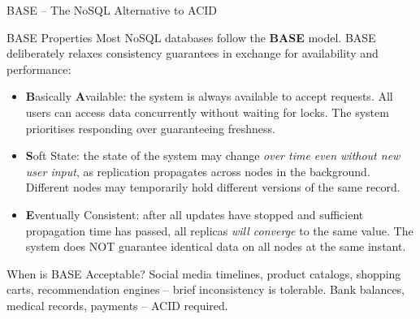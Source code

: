 \begin{frame}{BASE -- The NoSQL Alternative to ACID}
  \begin{block}{BASE Properties}
    Most NoSQL databases follow the \textbf{BASE} model. BASE deliberately relaxes consistency
    guarantees in exchange for availability and performance:
  \end{block}

  \begin{itemize}
    \item \textbf{B}asically \textbf{A}vailable: the system is always available to accept
          requests. All users can access data concurrently without waiting for locks.
          The system prioritises responding over guaranteeing freshness.

    \item \textbf{S}oft State: the state of the system may change \emph{over time even without
          new user input}, as replication propagates across nodes in the background.
          Different nodes may temporarily hold different versions of the same record.

    \item \textbf{E}ventually Consistent: after all updates have stopped and sufficient
          propagation time has passed, all replicas \emph{will converge} to the same value.
          The system does NOT guarantee identical data on all nodes at the same instant.
  \end{itemize}

  \begin{exampleblock}{When is BASE Acceptable?}
    Social media timelines, product catalogs, shopping carts, recommendation engines --
    brief inconsistency is tolerable. Bank balances, medical records, payments -- ACID required.
  \end{exampleblock}
\end{frame}

